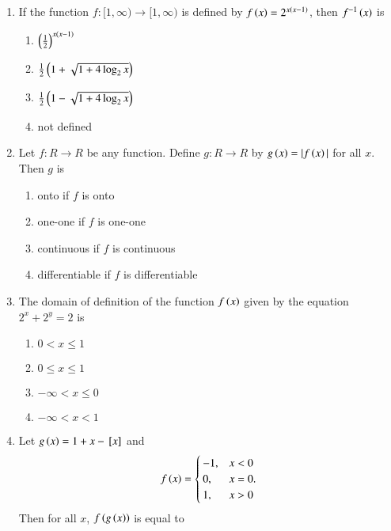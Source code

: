 \documentclass[journal]{IEEEtran}
\begin{document}
\begin{enumerate}
\item If the function $f:[1,\infty)\to[1,\infty)$ is defined by $f\left(x\right)=2^{x\left(x-1\right)}$, then $f^{-1}\left(x\right)$ is

\hfill{}

\begin{multicols}{2}
	\begin{enumerate}
		\item $\left(\frac{1}{2}\right)^{x\left(x-1\right)}$ 
		\item $\frac{1}{2}\left(1+\sqrt{1+4\log_{2}{x}}\right)$
		\item $\frac{1}{2}\left(1-\sqrt{1+4\log_{2}{x}}\right)$ 
		\item not defined
	\end{enumerate}
\end{multicols}

\item Let $f:R\to R$ be any function. Define $g:R\to R$ by $g\left(x\right)=|f\left(x\right)|$ for all $x$. Then $g$ is

\hfill{}

\begin{enumerate}
\item onto if $f$ is onto
\item one-one if $f$ is one-one
\item continuous if $f$ is continuous
\item differentiable if $f$ is differentiable
\end{enumerate}

\item The domain of definition of the function $f\left(x\right)$ given by the equation $2^{x}+2^{y}=2$ is

\hfill{}

\begin{multicols}{2}
	\begin{enumerate}
		\item $0<x\le1$ 
		\item $0\le x\le1$
		\item $-\infty<x\le0$ 
		\item $-\infty<x<1$
	\end{enumerate}
\end{multicols}

\item Let $g\left(x\right)=1+x-{}\left[x\right]$ and
\begin{equation*}
f\left(x\right)=
\begin{cases}
-1, & \text{$x<0$} \\
0, & \text{$x=0$.} \\
1, & \text{$x>0$}
\end{cases}
\end{equation*}
Then for all $x$, $f\left(g\left(x\right)\right)$ is equal to


\end{enumerate}
\end{document}
